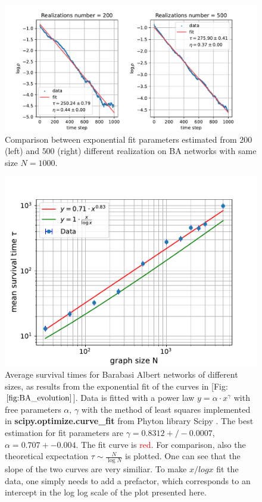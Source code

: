 \begin{figure}[H]
    \centering
    \includegraphics[width=\linewidth]{latex_source/images/voter/comparison.pdf}
    \caption{Comparison between exponential fit parameters estimated from $200$ (left) and $500$ (right) different realization on BA networks with same size $N=1000$. }
    \label{fig:enter-label}
\end{figure}

\begin{figure}[H]
    \centering
    \includegraphics[width=\linewidth]{latex_source/images/voter/BA_time_scaling.pdf}
    \caption{Average survival times for Barabasi Albert networks of different sizes, as results from the exponential fit of the curves in [Fig: $\ref{fig:BA_evolution}$]. Data is fitted with a power law $y = \alpha \cdot x^\gamma$ with free parameters $\alpha,\, \gamma$ with the method of least squares implemented in \textbf{scipy.optimize.curve\_fit} from Phyton library Scipy \cite{scipy}. The best estimation for fit parameters are $\gamma = 0.8312 +/- 0.0007$, $\alpha = 0.707 +- 0.004$. The fit curve is \textcolor{red}{red}. For comparison, also the theoretical expectation $\tau \sim \frac{N}{\log{N}}$ is plotted. One can see that the slope of the two curves are very similiar. To make $x/logx$ fit the data, one simply needs to add a prefactor, which corresponds to an intercept in the log log scale of the plot presented here.}
    \label{fig:BA_scaling}
\end{figure}